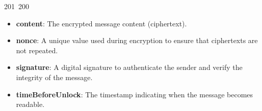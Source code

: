201~200~\documentclass{article}
\begin{document}
\begin{itemize}
	                                                                                                                                                                                                                                                                                                	                                                    \item \textbf{content}: The encrypted message content (ciphertext).  
	                                                                                                                                                                                                                                                                                                	                                                        \item \textbf{nonce}: A unique value used during encryption to ensure that ciphertexts are not repeated.  
	                                                                                                                                                                                                                                                                                                	                                                            \item \textbf{signature}: A digital signature to authenticate the sender and verify the integrity of the message.  
	                                                                                                                                                                                                                                                                                                	                                                                \item \textbf{timeBeforeUnlock}: The timestamp indicating when the message becomes readable.
	                                                                                                                                                                                                                                                                                                	                                                                \end{itemize}
\end{document}
